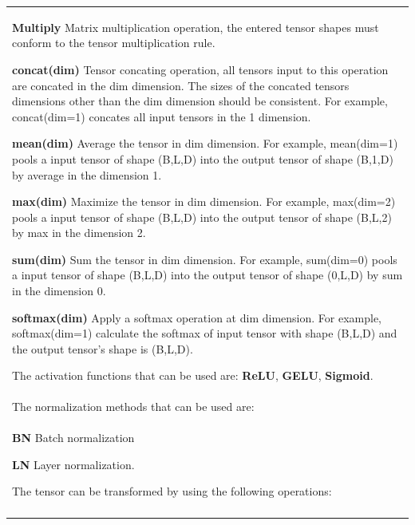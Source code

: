 \begin{table}[htbp]
{\begin{tabular}{p{}}
\begin{list}{}{\setlength{\leftmargin}{8mm}}
            \item \textbf{Multiply} Matrix multiplication operation, the entered tensor shapes must conform to the tensor multiplication rule.
            \item \textbf{concat(dim)} Tensor concating operation, all tensors input to this operation are concated in the dim dimension. The sizes of the concated tensors dimensions other than the dim dimension should be consistent. For example, concat(dim=1) concates all input tensors in the 1 dimension.
            \item \textbf{mean(dim)} Average the tensor in dim dimension. For example, mean(dim=1) pools a input tensor of shape (B,L,D) into the output tensor of shape (B,1,D) by average in the dimension 1.
            \item \textbf{max(dim)} Maximize the tensor in dim dimension. For example, max(dim=2) pools a input tensor of shape (B,L,D) into the output tensor of shape (B,L,2) by max in the dimension 2.
            \item \textbf{sum(dim)} Sum the tensor in dim dimension. For example, sum(dim=0) pools a input tensor of shape (B,L,D) into the output tensor of shape (0,L,D) by sum in the dimension 0.
            \item \textbf{softmax(dim)} Apply a softmax operation at dim dimension. For example, softmax(dim=1) calculate the softmax of input tensor with shape (B,L,D) and the output tensor's shape is (B,L,D).
        \end{list}
        \vspace{-3mm}
        The activation functions that can be used are: \textbf{ReLU}, \textbf{GELU}, \textbf{Sigmoid}.\\
        The normalization methods that can be used are:\\
        \vspace{-5mm}
        \begin{list}{}{\setlength{\leftmargin}{8mm}}
            \setlength{\itemsep}{0pt}
            \setlength{\parskip}{0pt}
            \item \textbf{BN} Batch normalization
            \item \textbf{LN} Layer normalization.
        \end{list}
        \vspace{-3mm}
        The tensor can be transformed by using the following operations:\\
        \vspace{-5mm}
        \begin{list}{}{\setlength{\leftmargin}{8mm}}

\end{list}
\end{tabular}}
\end{table}

